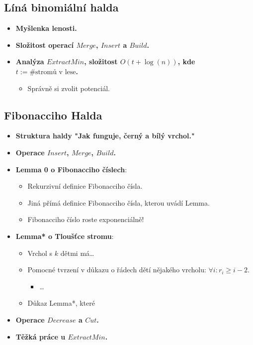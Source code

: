 \documentclass[11pt,a4paper]{article}
\begin{document}
\subsection{Líná binomiální halda}
    \begin{itemize}
        \item \textbf{Myšlenka lenosti.}
        \item \textbf{Složitost operací $Merge$, $Insert$ a $Build$.}
        \item \textbf{Analýza $ExtractMin$, složitost $O(t+\log(n))$, kde $t := \# \text{stromů v lese}$.}
        \begin{itemize}
            \item Správně si zvolit potenciál.
        \end{itemize}
    \end{itemize}
\subsection{Fibonacciho Halda}
    \begin{itemize}
        \item \textbf{Struktura haldy "Jak funguje, černý a bílý vrchol."}
        \item \textbf{Operace $Insert$, $Merge$, $Build$.}
        \item \textbf{Lemma 0 o Fibonacciho číslech}:
        \begin{itemize}
            \item Rekurzivní definice Fibonacciho čísla.
            \item Jiná přímá definice Fibonacciho čísla, kterou uvádí Lemma.
            \item Fibonacciho číslo roste exponenciálně!
        \end{itemize}
        \item \textbf{Lemma* o Tloušťce stromu}:
        \begin{itemize}
            \item Vrchol s $k$ dětmi má\dots
            \item Pomocné tvrzení v důkazu o řádech dětí nějakého vrcholu: $\forall i: r_i \geq i - 2$.
            \begin{itemize}
                \item \dots
            \end{itemize}
            \item Důkaz Lemma*, které
        \end{itemize}
        \item \textbf{Operace $Decrease$ a $Cut$.}
        \item \textbf{Těžká práce u $ExtractMin$.}
    \end{itemize}
\end{document}
